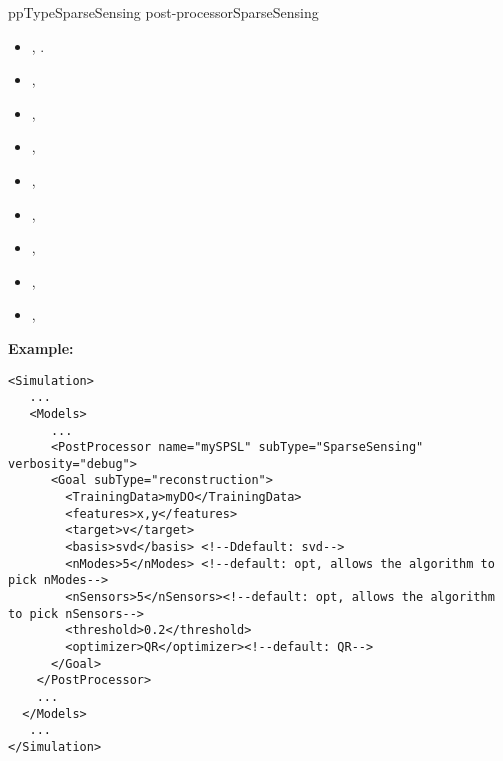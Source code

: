 ppType{SparseSensing post-processor}{SparseSensing}
\begin{itemize}
	\item {}, .
	\item {}, \xmlDesc{}
	\item {}, \xmlDesc{}
	\item {}, \xmlDesc{}
	\item {}, \xmlDesc{}
	\item {}, \xmlDesc{}
	\item {}, \xmlDesc{}
	\item {}, \xmlDesc{}
	\item {}, \xmlDesc{}
\end{itemize}

\textbf{Example:}
\begin{lstlisting}[style=XML]
<Simulation>
   ...
   <Models>
      ...
      <PostProcessor name="mySPSL" subType="SparseSensing" verbosity="debug">
      <Goal subType="reconstruction">
        <TrainingData>myDO</TrainingData>
        <features>x,y</features>
        <target>v</target>
        <basis>svd</basis> <!--Ddefault: svd-->
        <nModes>5</nModes> <!--default: opt, allows the algorithm to pick nModes-->
        <nSensors>5</nSensors><!--default: opt, allows the algorithm to pick nSensors-->
        <threshold>0.2</threshold>
        <optimizer>QR</optimizer><!--default: QR-->
      </Goal>
    </PostProcessor>
    ...
  </Models>
   ...
</Simulation>
\end{lstlisting}